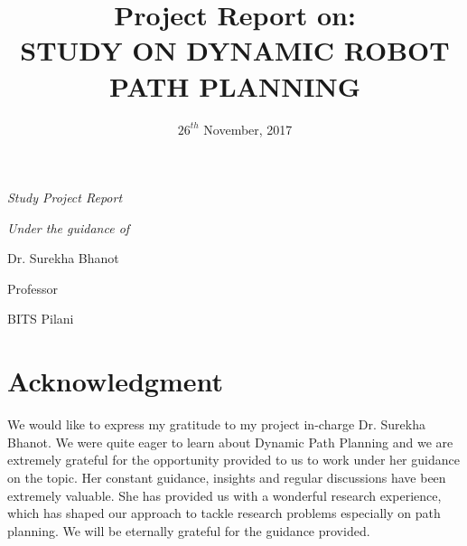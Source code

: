 \documentclass[a4paper, 12pt]{article}
\begin{document}
\title{\textbf{Project Report on: \\ STUDY ON DYNAMIC ROBOT PATH PLANNING}}
\date{$26^{th}$ November, 2017}

\maketitle
\centerline{}
\centerline{}
\centerline{\textit{\large Study Project Report}}
\centerline{}
\centerline{}
\centerline{}
\centerline{\textit{\large Under the guidance of}}
\centerline{}
\centerline{\newline Dr. Surekha Bhanot}
\centerline{Professor}
\centerline{BITS Pilani}
\vfill
{}
\rightline{}
\rightline{}
\rightline{}

\newpage
\section*{Acknowledgment}

We would like to express my gratitude to my project in-charge Dr. Surekha Bhanot. We were quite eager to learn about Dynamic Path Planning and we are extremely grateful for the opportunity provided to us to work under her guidance on the topic. Her constant guidance, insights and regular discussions have been extremely valuable. She has provided us with a wonderful research experience, which has shaped our approach to tackle research problems especially on path planning. We will be eternally grateful for the guidance provided.

\newpage
\tableofcontents
\newpage


\newpage
{}
\end{document}
